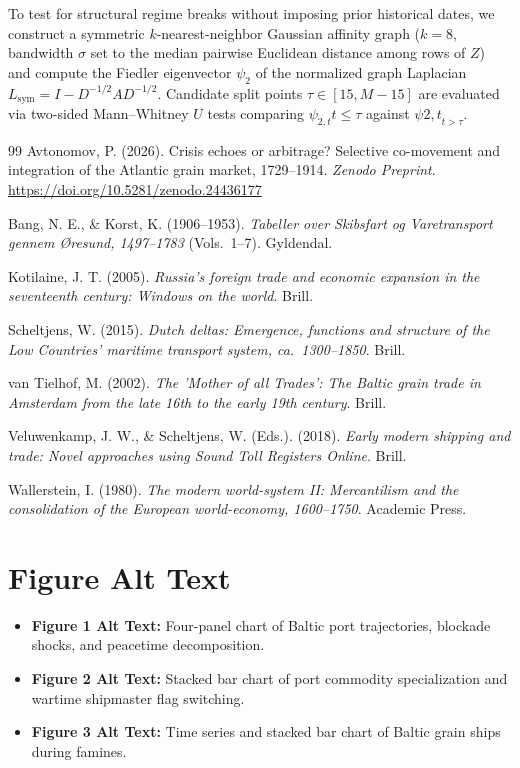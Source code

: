 \documentclass[11pt,a4paper]{article}
\begin{document}
To test for structural regime breaks without imposing prior historical dates, we construct a symmetric $k$-nearest-neighbor Gaussian affinity graph ($k=8$, bandwidth $\sigma$ set to the median pairwise Euclidean distance among rows of $Z$) and compute the Fiedler eigenvector $\psi_2$ of the normalized graph Laplacian $L_{\mathrm{sym}} = I - D^{-1/2} A D^{-1/2}$. Candidate split points $\tau \in [15, M-15]$ are evaluated via two-sided Mann--Whitney $U$ tests comparing ${\psi_{2,t}}{t \le \tau}$ against ${\psi{2,t}}_{t > \tau}$.
\begin{thebibliography}{99}
Avtonomov, P. (2026). Crisis echoes or arbitrage? Selective co-movement and integration of the Atlantic grain market, 1729--1914. \emph{Zenodo Preprint}. \url{https://doi.org/10.5281/zenodo.24436177}


Bang, N. E., \& Korst, K. (1906--1953). \emph{Tabeller over Skibsfart og Varetransport gennem Øresund, 1497--1783} (Vols.\ 1--7). Gyldendal.

Kotilaine, J. T. (2005). \emph{Russia's foreign trade and economic expansion in the seventeenth century: Windows on the world}. Brill.

Scheltjens, W. (2015). \emph{Dutch deltas: Emergence, functions and structure of the Low Countries' maritime transport system, ca.\ 1300--1850}. Brill.

van Tielhof, M. (2002). \emph{The 'Mother of all Trades': The Baltic grain trade in Amsterdam from the late 16th to the early 19th century}. Brill.

Veluwenkamp, J. W., \& Scheltjens, W. (Eds.). (2018). \emph{Early modern shipping and trade: Novel approaches using Sound Toll Registers Online}. Brill.

Wallerstein, I. (1980). \emph{The modern world-system II: Mercantilism and the consolidation of the European world-economy, 1600--1750}. Academic Press.

\end{thebibliography}

\section*{Figure Alt Text}
\begin{itemize}
\item \textbf{Figure 1 Alt Text:} Four-panel chart of Baltic port trajectories, blockade shocks, and peacetime decomposition.
\item \textbf{Figure 2 Alt Text:} Stacked bar chart of port commodity specialization and wartime shipmaster flag switching.
\item \textbf{Figure 3 Alt Text:} Time series and stacked bar chart of Baltic grain ships during famines.
\end{itemize}
\end{document}
